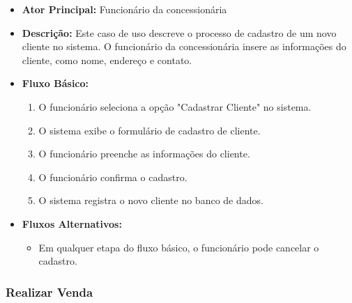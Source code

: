 \begin{itemize}
	\item \textbf{Ator Principal:} Funcionário da concessionária
	\item \textbf{Descrição:} Este caso de uso descreve o processo de cadastro de um novo cliente no sistema. O funcionário da concessionária insere as informações do cliente, como nome, endereço e contato.
	\item \textbf{Fluxo Básico:}
	\begin{enumerate}
		\item O funcionário seleciona a opção "Cadastrar Cliente" no sistema.
		\item O sistema exibe o formulário de cadastro de cliente.
		\item O funcionário preenche as informações do cliente.
		\item O funcionário confirma o cadastro.
		\item O sistema registra o novo cliente no banco de dados.
	\end{enumerate}
	\item \textbf{Fluxos Alternativos:}
	\begin{itemize}
		\item Em qualquer etapa do fluxo básico, o funcionário pode cancelar o cadastro.
	\end{itemize}
\end{itemize}

\subsubsection{Realizar Venda}

